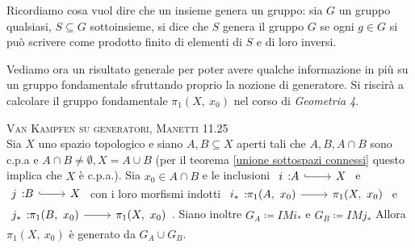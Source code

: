 Ricordiamo cosa vuol dire che un insieme genera un gruppo: sia $G$ un gruppo qualsiasi, $S\subseteq G$ sottoinsieme, si dice che $S$ genera il gruppo $G$ se ogni $g\in G$ si può scrivere come prodotto finito di elementi di $S$ e di loro inversi. \newline

Vediamo ora un risultato generale per poter avere qualche informazione in più su un gruppo fondamentale sfruttando proprio la nozione di generatore. Si riscirà a calcolare il gruppo fondamentale $\pi_1(X,\ x_0)$ nel corso di \textit{Geometria 4}.
\begin{theorema} \textsc{Van Kampfen su generatori, Manetti 11.25} \label{van kampfen} \\
	Sia $X$ uno spazio topologico e siano $A,B\subseteq X$ aperti tali che $A,B,A\cap B$ sono c.p.a e $A\cap B\neq\emptyset, X=A\cup B$ (per il teorema \ref{unione sottospazi connessi} questo implica che $X$ è c.p.a.).	Sia $x_0\in A\cap B$ e le inclusioni $\incl i A X$ e $\incl j B X$ con i loro morfismi indotti $\funz {i_*} {\pi_1(A,\ x_0)} {\pi_1(X,\ x_0)}$ e $\funz {j_*} {\pi_1(B,\ x_0)} {\pi_1(X,\ x_0)}$. Siano inoltre $G_A\coloneqq 	IM i_*$ e $G_B\coloneqq IM j_*$\newline
	Allora $\pi_1(X,\ x_0)$ è generato da $G_A\cup G_B$.
\end{theorema}
